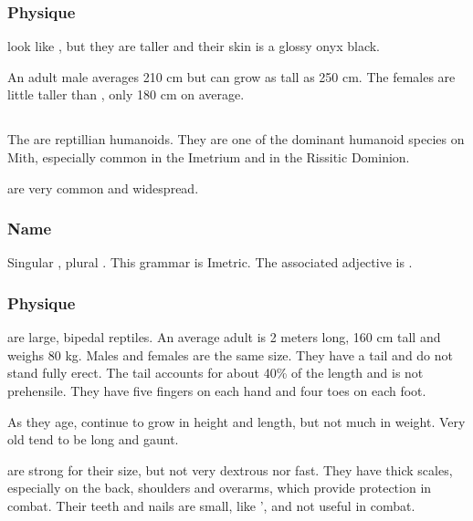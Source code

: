 \subsubsection{Physique}
\Resphain{} look like \humans{}, but they are taller and their skin is a glossy onyx black. 

An adult male \resphan{} averages 210 cm but can grow as tall as 250 cm. The females are little taller than \humans{}, only 180 cm on average. 




\subsection{\Scatha{}}
\label{Scatha}
\label{Scathae}
The \scathae{} are reptillian humanoids. They are one of the dominant humanoid species on Mith, especially common in the Imetrium and in the Rissitic Dominion. 

\Scathae{} are very common and widespread. %

\subsubsection{Name}
Singular , plural . This grammar is Imetric. The associated adjective is . 


\subsubsection{Physique}
\Scathae{} are large, bipedal reptiles. An average adult \scatha{} is 2 meters long, 160 cm tall and weighs 80 kg. Males and females are the same size. They have a tail and do not stand fully erect. The tail accounts for about 40\% of the length and is not prehensile. They have five fingers on each hand and four toes on each foot. 

As they age, \scathae{} continue to grow in height and length, but not much in weight. Very old \scathae{} tend to be long and gaunt. 

\Scathae{} are strong for their size, but not very dextrous nor fast. They have thick scales, especially on the back, shoulders and overarms, which provide protection in combat. Their teeth and nails are small, like \humans{}', and not useful in combat. 

